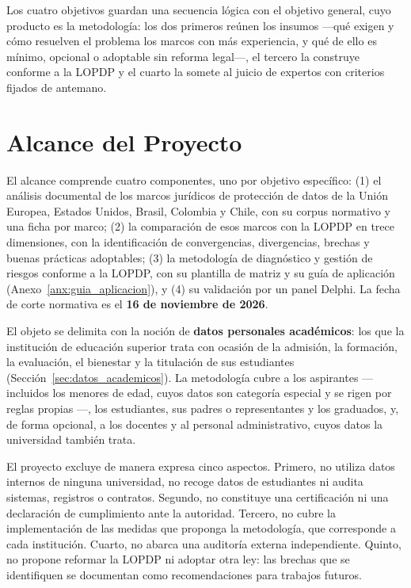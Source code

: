 Los cuatro objetivos guardan una secuencia lógica con el objetivo general, cuyo producto es la metodología: los dos primeros reúnen los insumos ---qué exigen y cómo resuelven el problema los marcos con más experiencia, y qué de ello es mínimo, opcional o adoptable sin reforma legal---, el tercero la construye conforme a la LOPDP y el cuarto la somete al juicio de expertos con criterios fijados de antemano.

\section{Alcance del Proyecto}
\label{sec:alcance}

El alcance comprende cuatro componentes, uno por objetivo específico: (1) el análisis documental de los marcos jurídicos de protección de datos de la Unión Europea, Estados Unidos, Brasil, Colombia y Chile, con su corpus normativo y una ficha por marco; (2) la comparación de esos marcos con la LOPDP en trece dimensiones, con la identificación de convergencias, divergencias, brechas y buenas prácticas adoptables; (3) la metodología de diagnóstico y gestión de riesgos conforme a la LOPDP, con su plantilla de matriz y su guía de aplicación (Anexo~\ref{anx:guia_aplicacion}), y (4) su validación por un panel Delphi. La fecha de corte normativa es el \textbf{16 de noviembre de 2026}.

El objeto se delimita con la noción de \textbf{datos personales académicos}: los que la institución de educación superior trata con ocasión de la admisión, la formación, la evaluación, el bienestar y la titulación de sus estudiantes (Sección~\ref{sec:datos_academicos}). La metodología cubre a los aspirantes ---incluidos los menores de edad, cuyos datos son categoría especial y se rigen por reglas propias \cite[arts.~21 y 25]{lopdp2021}---, los estudiantes, sus padres o representantes y los graduados, y, de forma opcional, a los docentes y al personal administrativo, cuyos datos la universidad también trata.

El proyecto excluye de manera expresa cinco aspectos. Primero, no utiliza datos internos de ninguna universidad, no recoge datos de estudiantes ni audita sistemas, registros o contratos. Segundo, no constituye una certificación ni una declaración de cumplimiento ante la autoridad. Tercero, no cubre la implementación de las medidas que proponga la metodología, que corresponde a cada institución. Cuarto, no abarca una auditoría externa independiente. Quinto, no propone reformar la LOPDP ni adoptar otra ley: las brechas que se identifiquen se documentan como recomendaciones para trabajos futuros.

